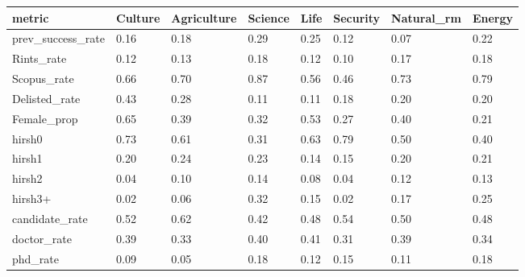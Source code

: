 \begin{table}
\centering
\begin{tabular}[t]{llllllll}
\toprule
metric & Culture & Agriculture & Science & Life & Security & Natural_rm & Energy\\
\midrule
prev_success_rate & 0.16 & 0.18 & 0.29 & 0.25 & 0.12 & 0.07 & 0.22\\
Rints_rate & 0.12 & 0.13 & 0.18 & 0.12 & 0.10 & 0.17 & 0.18\\
Scopus_rate & 0.66 & 0.70 & 0.87 & 0.56 & 0.46 & 0.73 & 0.79\\
Delisted_rate & 0.43 & 0.28 & 0.11 & 0.11 & 0.18 & 0.20 & 0.20\\
Female_prop & 0.65 & 0.39 & 0.32 & 0.53 & 0.27 & 0.40 & 0.21\\
hirsh0 & 0.73 & 0.61 & 0.31 & 0.63 & 0.79 & 0.50 & 0.40\\
hirsh1 & 0.20 & 0.24 & 0.23 & 0.14 & 0.15 & 0.20 & 0.21\\
hirsh2 & 0.04 & 0.10 & 0.14 & 0.08 & 0.04 & 0.12 & 0.13\\
hirsh3+ & 0.02 & 0.06 & 0.32 & 0.15 & 0.02 & 0.17 & 0.25\\
candidate_rate & 0.52 & 0.62 & 0.42 & 0.48 & 0.54 & 0.50 & 0.48\\
doctor_rate & 0.39 & 0.33 & 0.40 & 0.41 & 0.31 & 0.39 & 0.34\\
phd_rate & 0.09 & 0.05 & 0.18 & 0.12 & 0.15 & 0.11 & 0.18\\
\bottomrule
\end{tabular}
\end{table}
